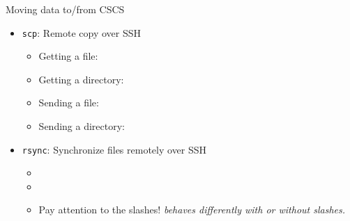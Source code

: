 \begin{frame}{Moving data to/from CSCS}
  \begin{itemize}
  \item \texttt{scp}: Remote copy over SSH
    \begin{itemize}
    \item Getting a file: 
    \item Getting a directory: 
    \item Sending a file: 
    \item Sending a directory: 
    \end{itemize}
  \item \texttt{rsync}: Synchronize files remotely over SSH
    \begin{itemize}
    \item {}
    \item {}
    \item Pay attention to the slashes!  \emph{behaves differently
      with or without slashes.}
    \end{itemize}
  \end{itemize}
\end{frame}

